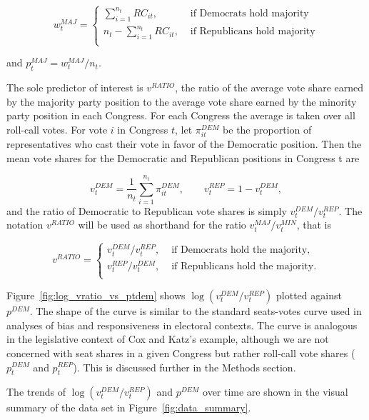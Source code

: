 $$w_t^{MAJ} =
\begin{cases} \sum_{i=1}^{n_t} RC_{it}, & \text{ if Democrats hold majority} \\
n_t - \sum_{i=1}^{n_t} RC_{it}, & \text{ if Republicans hold majority} \\
\end{cases}
 $$
 
\noindent and $p_t^{MAJ} = w_t^{MAJ} / n_t$.

The sole predictor of interest is $v^{RATIO}$, the ratio of the average vote share earned by the majority party position to the average vote share earned by the minority party position in each Congress.  For each Congress the average is taken over all roll-call votes.  For vote $i$ in Congress $t$, let $\pi_{it}^{DEM}$ be the proportion of representatives who cast their vote in favor of the Democratic position.  Then the mean vote shares for the Democratic and Republican positions in Congress t are

{\singlespacing
$$v_t^{DEM} = \frac{1}{n_t} \sum_{i=1}^{n_t} \pi_{it}^{DEM}, \qquad v_t^{REP} = 1 - v_t^{DEM},$$
}
%
\noindent and the ratio of Democratic to Republican vote shares is simply $v_t^{DEM} / v_t^{REP}$. The notation $v^{RATIO}$ will be used as shorthand for the ratio $v_t^{MAJ} / v_t^{MIN}$, that is 

$$ v^{RATIO} = 
\begin{cases} 
v_t^{DEM} / v_t^{REP}, & \text{ if Democrats hold the majority,} \\
v_t^{REP} / v_t^{DEM}, & \text{ if Republicans hold the majority.} \\
\end{cases}$$

Figure~\ref{fig:log_vratio_vs_ptdem} shows $\log{(v_t^{DEM} / v_t^{REP} )}$ plotted against $p^{DEM}$. The shape of the curve is similar to the standard seats-votes curve used in analyses of bias and responsiveness in electoral contexts. The curve is analogous in the legislative context of Cox and Katz's example, although we are not concerned with seat shares in a given Congress but rather roll-call vote shares ($p_t^{DEM}$ and $p_t^{REP}$). This is discussed further in the Methods section. 

The trends of $\log{(v_t^{DEM} / v_t^{REP} )}$ and $p^{DEM}$ over time are shown in the visual summary of the data set in Figure~\ref{fig:data_summary}.

